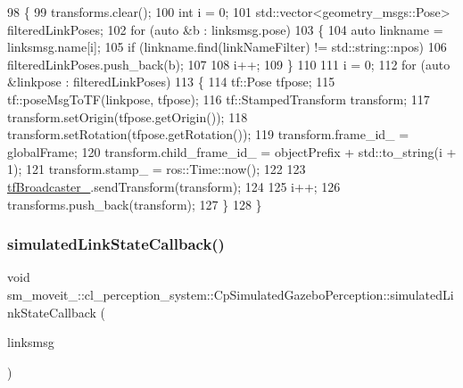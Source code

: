 \begin{DoxyCode}
98             \{
99                 transforms.clear();
100                 \textcolor{keywordtype}{int} i = 0;
101                 std::vector<geometry\_msgs::Pose> filteredLinkPoses;
102                 \textcolor{keywordflow}{for} (\textcolor{keyword}{auto} &b : linksmsg.pose)
103                 \{
104                     \textcolor{keyword}{auto} linkname = linksmsg.name[i];
105                     \textcolor{keywordflow}{if} (linkname.find(linkNameFilter) != std::string::npos)
106                         filteredLinkPoses.push\_back(b);
107 
108                     i++;
109                 \}
110 
111                 i = 0;
112                 \textcolor{keywordflow}{for} (\textcolor{keyword}{auto} &linkpose : filteredLinkPoses)
113                 \{
114                     tf::Pose tfpose;
115                     tf::poseMsgToTF(linkpose, tfpose);
116                     tf::StampedTransform transform;
117                     transform.setOrigin(tfpose.getOrigin());
118                     transform.setRotation(tfpose.getRotation());
119                     transform.frame\_id\_ = globalFrame;
120                     transform.child\_frame\_id\_ = objectPrefix + std::to\_string(i + 1);
121                     transform.stamp\_ = ros::Time::now();
122 
123                     \hyperlink{classsm__moveit__4_1_1cl__perception__system_1_1CpSimulatedGazeboPerception_a413594aa743f273c844795ff9f2f724b}{tfBroadcaster\_}.sendTransform(transform);
124 
125                     i++;
126                     transforms.push\_back(transform);
127                 \}
128             \}
\end{DoxyCode}
\mbox{\label{classsm__moveit__4_1_1cl__perception__system_1_1CpSimulatedGazeboPerception_a7914ffd20518c866a8a1e11254589d12}} 
\subsubsection{\texorpdfstring{simulated\+Link\+State\+Callback()}{simulatedLinkStateCallback()}}
{\footnotesize\ttfamily void sm\+\_\+moveit\+\_\+::cl\+\_\+perception\+\_\+system\+::\+Cp\+Simulated\+Gazebo\+Perception\+::simulated\+Link\+State\+Callback (\begin{DoxyParamCaption}\item[{const gazebo\+\_\+msgs\+::\+Link\+States \&}]{linksmsg }\end{DoxyParamCaption})\hspace{0.3cm}{\ttfamily [inline]}}




